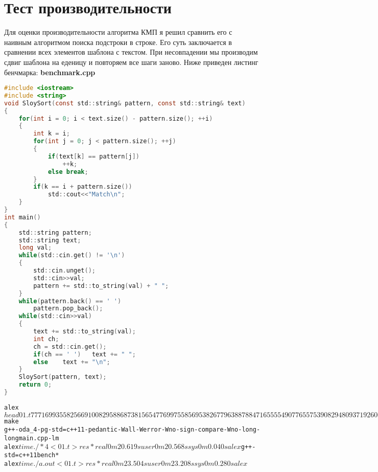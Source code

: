 \section{Тест производительности}
Для оценки производительности алгоритма КМП я решил сравнить его с наивным алгоритмом поиска подстроки в строке. Его суть заключается в сравнении всех элементов шаблона с текстом. При несовпадении мы производим сдвиг шаблона на еденицу и повторяем все шаги заново.
Ниже приведен листинг бенчмарка:
\textbf{benchmark.cpp}
\begin{lstlisting}[language=C]
#include <iostream>
#include <string>
void SloySort(const std::string& pattern, const std::string& text)
{
    for(int i = 0; i < text.size() - pattern.size(); ++i)
    {
        int k = i;
        for(int j = 0; j < pattern.size(); ++j)
        {
            if(text[k] == pattern[j])
                ++k;
            else break;
        }
        if(k == i + pattern.size())
            std::cout<<"Match\n";
    }
}
int main()
{
    std::string pattern;
    std::string text;
    long val;
    while(std::cin.get() != '\n')
    {
        std::cin.unget();
        std::cin>>val;
        pattern += std::to_string(val) + " ";
    }
    while(pattern.back() == ' ')
        pattern.pop_back();
    while(std::cin>>val)
    {
        text += std::to_string(val);
        int ch;
        ch = std::cin.get();
        if(ch == ' ')	text += " ";
        else	text += "\n";
    }
    SloySort(pattern, text);
    return 0;
}
\end{lstlisting}
\begin{alltt}
alex$head 01.t
77 71 69 93
55 82 56 69100 82 95 8868 73 81 5654 77 69 9755 85 69 5382 67 79 6388 78 84 7165 55 54 9077 65 57 5390 82 94 8093 71 92 6066 58 96 5451 66 64 8476 54 58 8060 67 80 6256 85 100 5579 61 83 5152 93 94 7774 79 98 5454 82 55 6970 51 58 9089 99 95 69100 92 76 5069 55 93 6552 74 51 9890 79 88 7862 96 75 6562 88 58 7780 86 94 8065 75 60 9381 80 67 9851 94 56 8487 55 66 9371 80 61 6497 92 83 9190 81 92 69100 91 65 7182 62 90 6979 97 87 7196 73 61 5582 74 86 7461 82 54 6750 71 52 7983 75 52 7261 58 71 10055 58 54 93100 78 52 6581 96 66 9957 63 56 5761 98 53 8757 100 91 9872 61 86 8488 90 58 6087 87 63 8970 85 78 5364 60 81 10057 88 85 6173 55 71 5776 72 91 7886 86 55 8852 52 79 9272 76 92 6961 71 85 5454 84 56 9195 77 79 5360 74 95 7684 71 86 9282 66 77 5156 83 75 8883 62 70 5259 82 60 7476 91 90 
alex$make
g++ -o da_4 -pg -std=c++11 -pedantic -Wall -Werror -Wno-sign-compare -Wno-long-long main.cpp -lm
alex$time ./*4 < 01.t > res*

real    0m20.619s
user    0m20.568s
sys     0m0.040s
alex$g++ -std=c++11 bench*
alex$time ./a.out < 01.t > res*

real    0m23.504s
user    0m23.208s
sys     0m0.280s
alex$
\end{alltt}
